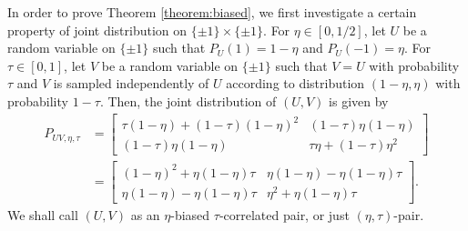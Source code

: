 \documentclass[journal,draftcls, onecolumn]{IEEEtran}
\begin{document}
In order to prove Theorem \ref{theorem:biased}, we first investigate 
a certain property of joint distribution on $\{\pm1\} \times \{\pm 1\}$.
For $\eta \in [0,1/2]$, let $U$ be a random variable on $\{ \pm 1\}$ such that $P_U(1)=1-\eta$
and $P_U(-1) = \eta$. For $\tau \in [0,1]$, let $V$ be a random variable on $\{ \pm 1\}$ such that
$V = U$ with probability $\tau$ and $V$ is sampled independently of $U$ according to distribution $(1-\eta,\eta)$ with probability $1-\tau$.
Then, the joint distribution of $(U,V)$ is given by
\begin{align}
P_{UV,\eta,\tau} &=\left[
\begin{array}{cc}
\tau(1-\eta)+(1-\tau)(1-\eta)^2 & (1-\tau)\eta(1-\eta) \\
(1-\tau)\eta(1-\eta) & \tau \eta + (1-\tau)\eta^2 
\end{array}
\right] \\
&= \left[
\begin{array}{cc}
(1-\eta)^2 + \eta(1-\eta)\tau & \eta(1-\eta) - \eta(1-\eta)\tau \\
\eta(1-\eta) - \eta(1-\eta)\tau & \eta^2 + \eta(1-\eta)\tau
\end{array}
\right]. \label{eq:eta-tau-pair}
\end{align}
We shall call $(U,V)$ as an $\eta$-biased $\tau$-correlated pair, or just $(\eta,\tau)$-pair.
\end{document}
